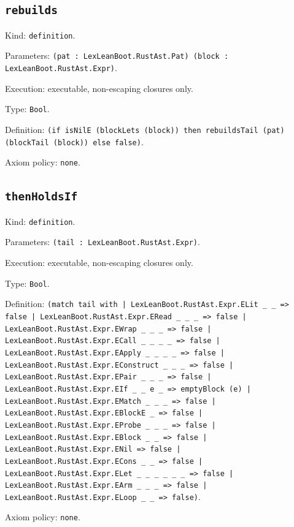 \documentclass[11pt]{article}
\begin{document}
\subsection*{\texttt{rebuilds}}
\noindent Kind: \texttt{definition}.\par
\noindent Parameters: \texttt{(pat : LexLeanBoot.RustAst.Pat) (block : LexLeanBoot.RustAst.Expr)}.\par
\noindent Execution: executable, non-escaping closures only.\par
\noindent Type: \texttt{Bool}.\par
\noindent Definition: \texttt{(if isNilE (blockLets (block)) then rebuildsTail (pat) (blockTail (block)) else false)}.\par
\noindent Axiom policy: \texttt{none}.\par
\subsection*{\texttt{thenHoldsIf}}
\noindent Kind: \texttt{definition}.\par
\noindent Parameters: \texttt{(tail : LexLeanBoot.RustAst.Expr)}.\par
\noindent Execution: executable, non-escaping closures only.\par
\noindent Type: \texttt{Bool}.\par
\noindent Definition: \texttt{(match tail with | LexLeanBoot.RustAst.Expr.ELit \_ \_ => false | LexLeanBoot.RustAst.Expr.ERead \_ \_ \_ => false | LexLeanBoot.RustAst.Expr.EWrap \_ \_ \_ => false | LexLeanBoot.RustAst.Expr.ECall \_ \_ \_ \_ => false | LexLeanBoot.RustAst.Expr.EApply \_ \_ \_ \_ => false | LexLeanBoot.RustAst.Expr.EConstruct \_ \_ \_ => false | LexLeanBoot.RustAst.Expr.EPair \_ \_ \_ => false | LexLeanBoot.RustAst.Expr.EIf \_ \_ e \_ => emptyBlock (e) | LexLeanBoot.RustAst.Expr.EMatch \_ \_ \_ => false | LexLeanBoot.RustAst.Expr.EBlockE \_ => false | LexLeanBoot.RustAst.Expr.EProbe \_ \_ \_ => false | LexLeanBoot.RustAst.Expr.EBlock \_ \_ => false | LexLeanBoot.RustAst.Expr.ENil => false | LexLeanBoot.RustAst.Expr.ECons \_ \_ => false | LexLeanBoot.RustAst.Expr.ELet \_ \_ \_ \_ \_ \_ => false | LexLeanBoot.RustAst.Expr.EArm \_ \_ \_ => false | LexLeanBoot.RustAst.Expr.ELoop \_ \_ => false)}.\par
\noindent Axiom policy: \texttt{none}.\par
\end{document}
